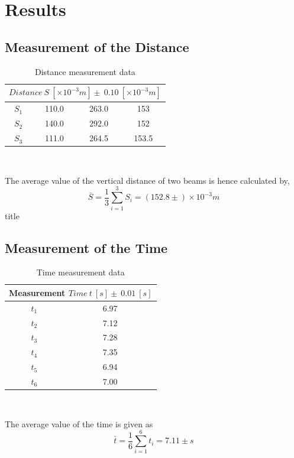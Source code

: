 \documentclass[12pt]{article}
\begin{document}
        \section{Results}
        \subsection{Measurement of the Distance}
        \begin{table}[h]
        \centering
        \begin{tabular}{|c|c|c|c|}
            \hline
            \multicolumn{4}{|c|}{$Distance\ S\ [\times10^{-3}m] \pm\ 0.10\ [\times10^{-3}m]$}\\
            \hline
            $S_1$ &110.0 & 263.0 &153\\
            \hline
            $S_2$ &140.0 &292.0 &152\\
            \hline
            $S_3$ &111.0 &264.5 &153.5\\     
            \hline
        \end{tabular}\\
        \caption{Distance measurement data}
        \label{distance}
        \end{table}
        The average value of the vertical distance of two beams is hence calculated by,
        $$\bar{S}=\frac{1}{3}\sum_{i=1}^{3}S_i=(152.8\pm )\times10^{-3}m$$title
        \subsection{Measurement of the Time}
        \begin{table}[htbp]
        \centering
        \begin{tabular}{|c|c|}
            \hline
            \multicolumn{2}{|c|}{Measurement $Time\ t\ [s] \pm\ 0.01\ [s]$}\\
            \hline
            $t_1$ & 6.97\\
            \hline
            $t_2$ & 7.12\\
            \hline
            $t_3$ & 7.28\\
            \hline
            $t_4$ & 7.35\\
            \hline
            $t_5$ & 6.94\\
            \hline
            $t_6$ & 7.00\\
            \hline
        \end{tabular}\\
        \caption{Time measurement data}
        \label{time}
    \end{table}
    The average value of the time is given as
    \[
        \bar{t}=\frac{1}{6}\sum_{i=1}^{6}t_i=7.11\pm s
    \]
\end{document}
